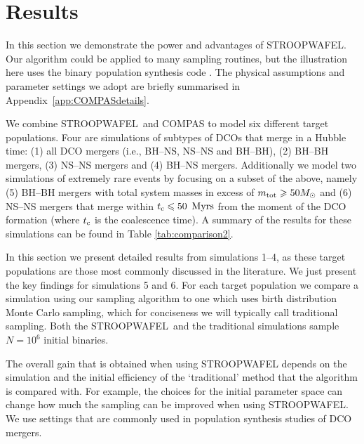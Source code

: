 \documentclass[a4paper,fleqn,usenatbib,useAMS,usedcolumn]{mnras}
\newcommand{\AISs}{\textsc{STROOPWAFEL}}
\begin{document}
\section{Results}
\label{sec:Results}

In this section we demonstrate the power and advantages of \AISs.  Our algorithm could be applied to many sampling routines, but the illustration here uses the binary population synthesis code {}  \citep{stevenson2017formation, 2018MNRAS.477.4685B, 2018MNRAS.481.4009V}.     The physical assumptions and parameter settings we adopt are briefly summarised in Appendix~\ref{app:COMPASdetails}. 
 
We combine \AISs \ and \textsc{COMPAS} to model six different target populations. Four are simulations of subtypes of DCOs that merge in a Hubble time:  (1) all DCO mergers (i.e., BH--NS, NS--NS and BH--BH), (2) BH--BH mergers, (3) NS--NS mergers and (4) BH--NS mergers. Additionally we model  two simulations of extremely rare events by focusing on a subset of the above, namely (5) BH--BH mergers with total system masses in excess of $m_{\rm{tot}} \geq 50 M_{\odot}$   and (6) NS--NS mergers that merge within $t_{\rm{c}} \leq 50$ $\rm{Myrs}$ from the moment of the DCO formation (where $t_{\rm{c}} $ is the coalescence time). A summary of the results for these simulations can be found in  Table \ref{tab:comparison2}.  

In this section we present detailed results from simulations 1--4, as these target populations are those most commonly discussed in the literature. We just present the key findings for simulations 5 and 6.  For each target population we compare a simulation using our sampling algorithm to one which uses birth distribution Monte Carlo sampling, which for conciseness we will typically call traditional sampling.  Both the \AISs \ and the traditional simulations sample $N = 10^6$ initial binaries. 

The overall gain that is obtained when using \AISs{} depends on the simulation and the initial efficiency of the `traditional' method that the algorithm is compared with. For example, the choices for the initial parameter space can change how much the sampling can be improved when using \AISs. We use settings that are commonly used in population synthesis studies of DCO mergers. 
\end{document}
